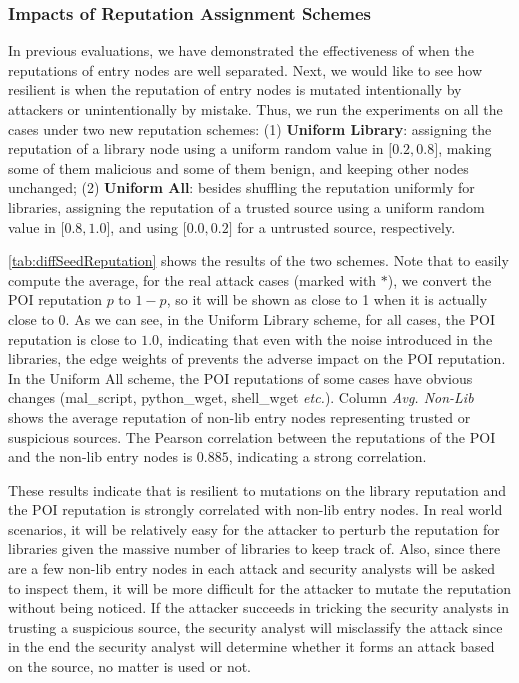 


\subsubsection{Impacts of Reputation Assignment Schemes}
\label{subsubsec:reputationeval}
In previous evaluations, 
we have demonstrated the effectiveness of \tool when the reputations of entry nodes are well separated. 
Next, we would like to see how resilient \tool is when the reputation of entry nodes is mutated intentionally by attackers or unintentionally by mistake. 
Thus, we run the experiments on all the cases under two new reputation schemes:
(1) \textbf{Uniform Library}: assigning the reputation of a library node using a uniform random value in $\lbrack 0.2, 0.8\rbrack$, \ie making some of them malicious and some of them benign,
and keeping other nodes unchanged;
(2) \textbf{Uniform All}: besides shuffling the reputation uniformly for libraries, assigning the reputation of a trusted source using a uniform random value in $\lbrack 0.8, 1.0\rbrack$, and using $\lbrack 0.0, 0.2\rbrack$ for a untrusted source, respectively.

\cref{tab:diffSeedReputation} shows the results of the two schemes.
Note that to easily compute the average, for the real attack cases (marked with $*$), we convert the POI reputation $p$ to $1 - p$, so it will be shown as close to 1 when it is actually close to 0.
As we can see, in the Uniform Library scheme, for all cases, the POI reputation is close to $1.0$, indicating that even with the noise introduced in the libraries, the edge weights of \tool prevents the adverse impact on the POI reputation. 
In the Uniform All scheme, the POI reputations of some cases have obvious changes (\eg mal\_script, python\_wget, shell\_wget \textit{etc.}). 
Column \textit{Avg. Non-Lib} shows the average reputation of non-lib entry nodes representing trusted or suspicious sources. The Pearson correlation between the reputations of the POI and the non-lib entry nodes is $0.885$, indicating a strong correlation.

These results indicate that \tool is resilient to mutations on the library reputation and the POI reputation is strongly correlated with non-lib entry nodes.
In real world scenarios,
it will be relatively easy for the attacker to perturb the reputation for libraries given the massive number of libraries to keep track of. 
Also, since there are a few non-lib entry nodes in each attack and security analysts will be asked to inspect them, it will be more difficult for the attacker to mutate the reputation without being noticed.
If the attacker succeeds in tricking the security analysts in trusting a suspicious source, the security analyst will misclassify the attack since in the end the security analyst will determine whether it forms an attack based on the source,
no matter \tool is used or not.


